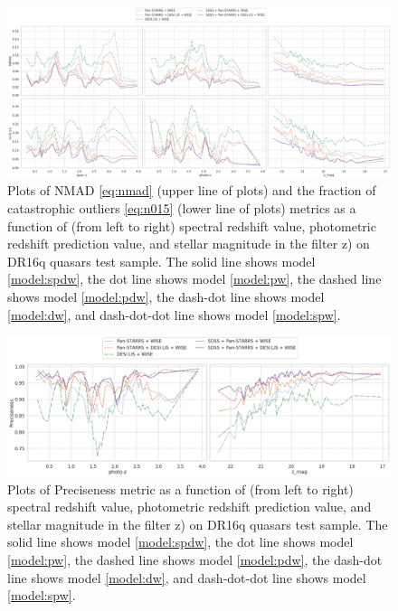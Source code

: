\documentclass[fleqn,usenatbib]{mnras}
\begin{document}
\begin{figure}
    \centering
    \includegraphics[width=0.9\linewidth]{images/metrics-dr16q-ab-mini.png}
    \caption{Plots of NMAD \eqref{eq:nmad} (upper line of plots) and the fraction of catastrophic outliers \eqref{eq:n015} (lower line of plots) metrics as a function of (from left to right) spectral redshift value, photometric redshift prediction value, and stellar magnitude in the filter z) on DR16q quasars test sample. The solid line shows model \ref{model:spdw}, the dot line shows model \ref{model:pw}, the dashed line shows model \ref{model:pdw}, the dash-dot line shows model \ref{model:dw}, and dash-dot-dot line shows model \ref{model:spw}.}
    \label{fig:metrics-dr16q}
\end{figure}

\begin{figure}
    \centering
    \includegraphics[width=0.9\linewidth]{images/metrics-prec-dr16q.png}
    \caption{Plots of Preciseness metric as a function of (from left to right) spectral redshift value, photometric redshift prediction value, and stellar magnitude in the filter z) on DR16q quasars test sample. The solid line shows model \ref{model:spdw}, the dot line shows model \ref{model:pw}, the dashed line shows model \ref{model:pdw}, the dash-dot line shows model \ref{model:dw}, and dash-dot-dot line shows model \ref{model:spw}.}
    \label{fig:metrics-prec-dr16q}
\end{figure}
\end{document}
